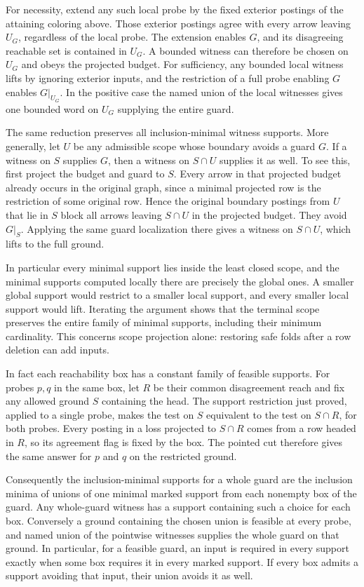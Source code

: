 For necessity, extend any such local probe by the
fixed exterior postings of the attaining coloring
above. Those exterior postings agree with every
arrow leaving $U_G$, regardless of the local probe.
The extension enables $G$, and its disagreeing
reachable set is contained in $U_G$. A bounded
witness can therefore be chosen on $U_G$ and obeys
the projected budget. For sufficiency, any bounded
local witness lifts by ignoring exterior inputs,
and the restriction of a full probe enabling $G$
enables $G|_{U_G}$. In the positive case the named
union of the local witnesses gives one bounded
word on $U_G$ supplying the entire guard.

The same reduction preserves all inclusion-minimal
witness supports. More generally, let $U$ be any
admissible scope whose boundary avoids a guard
$G$. If a witness on $S$ supplies $G$, then a
witness on $S\cap U$ supplies it as well.
To see this, first project the budget and guard
to $S$. Every arrow in that projected budget
already occurs in the original graph, since a
minimal projected row is the restriction of
some original row. Hence the original boundary
postings from $U$ that lie in $S$ block all
arrows leaving $S\cap U$ in the projected
budget. They avoid $G|_S$. Applying the same
guard localization there gives a witness
on $S\cap U$, which lifts to the full ground.

In particular every minimal support lies
inside the least closed scope, and the minimal
supports computed locally there are precisely
the global ones. A smaller global support
would restrict to a smaller local support,
and every smaller local support would lift.
Iterating the argument shows that the
terminal scope preserves the entire family
of minimal supports, including their
minimum cardinality. This concerns scope
projection alone: restoring safe folds
after a row deletion can add inputs.

In fact each reachability box has a constant
family of feasible supports. For probes $p,q$
in the same box, let $R$ be their common
disagreement reach and fix any allowed ground
$S$ containing the head. The support restriction
just proved, applied to a single probe, makes
the test on $S$ equivalent to the test on
$S\cap R$, for both probes. Every posting in
a loss projected to $S\cap R$ comes from a row
headed in $R$, so its agreement flag is fixed
by the box. The pointed cut therefore gives
the same answer for $p$ and $q$ on the
restricted ground.

Consequently the inclusion-minimal supports for
a whole guard are the inclusion minima of unions
of one minimal marked support from each nonempty
box of the guard. Any whole-guard witness has a
support containing such a choice for each box.
Conversely a ground containing the chosen union
is feasible at every probe, and named union of
the pointwise witnesses supplies the whole
guard on that ground. In particular, for a
feasible guard, an input is required in every
support exactly when some box requires it
in every marked support. If every box admits
a support avoiding that input, their union
avoids it as well.

